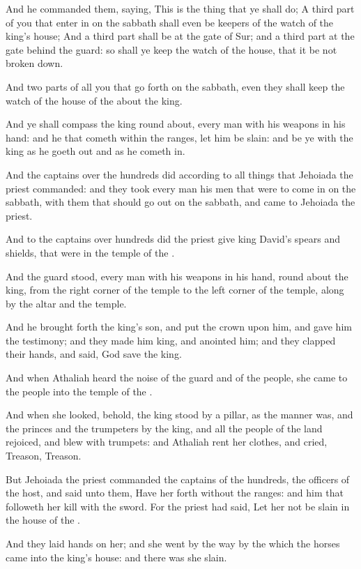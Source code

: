 \Verse And he commanded them, saying, This is the thing that ye shall do; A third part of you that enter in on the sabbath shall even be keepers of the watch of the king's house; \Verse And a third part shall be at the gate of Sur; and a third part at the gate behind the guard: so shall ye keep the watch of the house, that it be not broken down.

\Verse And two parts of all you that go forth on the sabbath, even they shall keep the watch of the house of the \LORD about the king.

\Verse And ye shall compass the king round about, every man with his weapons in his hand: and he that cometh within the ranges, let him be slain: and be ye with the king as he goeth out and as he cometh in.

\Verse And the captains over the hundreds did according to all things that Jehoiada the priest commanded: and they took every man his men that were to come in on the sabbath, with them that should go out on the sabbath, and came to Jehoiada the priest.

\Verse And to the captains over hundreds did the priest give king David's spears and shields, that were in the temple of the \LORD.

\Verse And the guard stood, every man with his weapons in his hand, round about the king, from the right corner of the temple to the left corner of the temple, along by the altar and the temple.

\Verse And he brought forth the king's son, and put the crown upon him, and gave him the testimony; and they made him king, and anointed him; and they clapped their hands, and said, God save the king.

\Verse And when Athaliah heard the noise of the guard and of the people, she came to the people into the temple of the \LORD.

\Verse And when she looked, behold, the king stood by a pillar, as the manner was, and the princes and the trumpeters by the king, and all the people of the land rejoiced, and blew with trumpets: and Athaliah rent her clothes, and cried, Treason, Treason.

\Verse But Jehoiada the priest commanded the captains of the hundreds, the officers of the host, and said unto them, Have her forth without the ranges: and him that followeth her kill with the sword. For the priest had said, Let her not be slain in the house of the \LORD.

\Verse And they laid hands on her; and she went by the way by the which the horses came into the king's house: and there was she slain.

